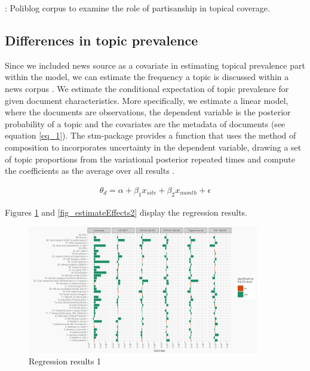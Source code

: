 \documentclass[12pt,a4paper,notitlepage]{article}
\begin{document}
\citep{roberts_navigating_2016}: Poliblog corpus to examine the role of partisanship in topical coverage.

\subsection{Differences in topic prevalence}
Since we included news source as a covariate in estimating topical prevalence part within the model, we can estimate the frequency a topic is discussed within a news corpus \citep{roberts_model_2016}. We estimate the conditional expectation of topic prevalence for given document characteristics. More specifically, we estimate a linear model, where the documents are observations, the dependent variable is the posterior probability of a topic and the covariates are the metadata of documents (see equation \ref{eq_1}). The stm-package provides a function that uses the method of composition to incorporates uncertainty in the dependent variable, drawing a set of topic proportions from the variational posterior repeated times and compute the coefficients as the average over all results \citep{roberts_stm:_2016}. 

\begin{align}\label{eq_1}
	\theta_d=\alpha+\beta_1x_{site}+\beta_2x_{month}+\epsilon
\end{align}

Figures \ref{fig_estimateEffects1} and \ref{fig_estimateEffects2} display the regression results.  

\begin{figure}[H]
	\caption{Regression results 1}
		\begin{center}
			\includegraphics[width=0.9\textwidth,keepaspectratio]{../figs/estimates_site.png}
		\end{center}
	\label{fig_estimateEffects1}
\end{figure}
\end{document}
